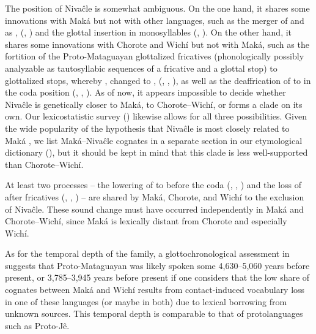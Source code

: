 The position of Nivaĉle is somewhat ambiguous. On the one hand, it shares some innovations with Maká but not with other languages, such as the merger of  and  as ,  (, ) and the glottal insertion in monosyllables (, ). On the other hand, it shares some innovations with Chorote and Wichí but not with Maká, such as the fortition of the Proto-Mataguayan glottalized fricatives (phonologically possibly analyzable as tautosyllabic sequences of a fricative and a glottal stop) to glottalized stops, whereby ,  changed to ,  (, , ), as well as the deaffrication of  to  in the coda position (, , ). As of now, it appears impossible to decide whether Nivaĉle is genetically closer to Maká, to Chorote--Wichí, or forms a clade on its own. Our lexicostatistic survey () likewise allows for all three possibilities. Given the wide popularity of the hypothesis that Nivaĉle is most closely related to Maká \citep[296]{AF05,LC-VG-07,PVB13a}, we list Maká--Nivaĉle cognates in a separate section in our etymological dictionary (), but it should be kept in mind that this clade is less well-supported than Chorote–Wichí.

At least two processes -- the lowering of  to  before the coda  (, , ) and the loss of  after fricatives (, , ) -- are shared by Maká, Chorote, and Wichí to the exclusion of Nivaĉle. These sound change must have occurred independently in Maká and Chorote--Wichí, since Maká is lexically distant from Chorote and especially Wichí.

As for the temporal depth of the family, a glottochronological assessment in  suggests that Proto-Mataguayan was likely spoken some 4,630--5,060 years before present, or 3,785--3,945 years before present if one considers that the low share of cognates between Maká and Wichí results from contact-induced vocabulary loss in one of these languages (or maybe in both) due to lexical borrowing from unknown sources. This temporal depth is comparable to that of protolanguages such as Proto-Jê.

